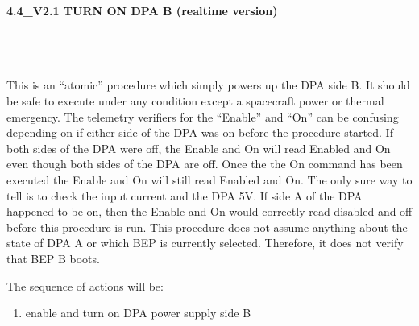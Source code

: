 \documentclass[11pt]{article}
\begin{document}
%
%
%
\newcommand{\be}{\begin{enumerate}}
\newcommand{\ee}{\end{enumerate}}
\newcommand{\bc}{\begin{center}}
\newcommand{\ec}{\end{center}}
\newcommand{\bi}{\begin{itemize}}
\newcommand{\ei}{\end{itemize}}
\newcommand{\bd}{\begin{description}}
\newcommand{\ed}{\end{description}}
\newcommand{\bt}{\begin{tabbing}}
\newcommand{\et}{\end{tabbing}}
\newcommand{\eg}{{\it e.g.~}}
\newcommand{\ie}{{\it i.e.~}}
\newcommand{\ul}{\underline}
\newcommand{\axaf}{{\em AXAF}}
\def\la{\hbox{\rlap{$<$}\lower0.5ex\hbox{$\sim$}\ }}


\large
\centerline {\bf 4.4\_V2.1 TURN ON DPA B (realtime version) }
\vspace{0.25in}

\normalsize
{}\\
 \\

 \\
\normalsize
This is an ``atomic'' procedure which simply powers up the DPA side B.
It should be safe to execute under any
condition except a spacecraft power or thermal emergency.
The telemetry verifiers for the ``Enable'' and ``On''  can be
confusing depending on if either side of the DPA was on before the
procedure started.  If both sides of the DPA were off, the Enable and
On will read Enabled and On even though both sides of the DPA are off.
Once the the On command has been executed the Enable and On will still
read Enabled and On.  The only sure way to tell is to check the input
current and the DPA 5V.  If side A of the DPA happened to be on, then
the Enable and On would correctly read disabled and off before this
procedure is run. This procedure does not assume anything about the
state of DPA A or which BEP is currently selected.  Therefore, it does
not verify that BEP B boots.


\vspace{0.25in}
\noindent The sequence of actions will be:
\be
\item enable and turn on DPA power supply side B
\ee
\end{document}
